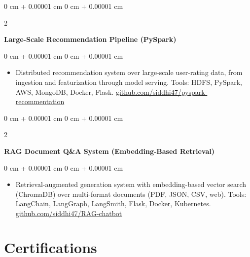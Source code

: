 \documentclass[10pt, letterpaper]{article}
\newenvironment{highlights}{
    \begin{itemize}[
        topsep=0.04 cm,
        parsep=0.04 cm,
        partopsep=0pt,
        itemsep=0pt,
        leftmargin=0 cm + 10pt
    ]
}{
    \end{itemize}
} %
\newenvironment{onecolentry}{
    \begin{adjustwidth}{
        0 cm + 0.00001 cm
    }{
        0 cm + 0.00001 cm
    }
}{
    \end{adjustwidth}
} %
\newenvironment{twocolentry}[2][]{
    \onecolentry
    \def\secondColumn{#2}
    \setcolumnwidth{\fill, 4.5 cm}
    \begin{paracol}{2}
}{
    \switchcolumn \raggedleft \secondColumn
    \end{paracol}
    \endonecolentry
} %
\begin{document}
        \vspace{0.1 cm}

        \begin{twocolentry}{
        }
            \textbf{Large-Scale Recommendation Pipeline (PySpark)}\end{twocolentry}

        \vspace{0.06 cm}
        \begin{onecolentry}
            \begin{highlights}
                \item Distributed recommendation system over large-scale user-rating data, from ingestion and featurization through model serving. Tools: HDFS, PySpark, AWS, MongoDB, Docker, Flask. \href{https://github.com/siddhi47/pyspark-recommentation}{github.com/siddhi47/pyspark-recommentation}
            \end{highlights}
        \end{onecolentry}

        \vspace{0.1 cm}

        \begin{twocolentry}{
        }
            \textbf{RAG Document Q\&A System (Embedding-Based Retrieval)}\end{twocolentry}

        \vspace{0.06 cm}
        \begin{onecolentry}
            \begin{highlights}
                \item Retrieval-augmented generation system with embedding-based vector search (ChromaDB) over multi-format documents (PDF, JSON, CSV, web). Tools: LangChain, LangGraph, LangSmith, Flask, Docker, Kubernetes. \href{https://github.com/siddhi47/RAG-chatbot}{github.com/siddhi47/RAG-chatbot}
            \end{highlights}
        \end{onecolentry}


    \section{Certifications}
        
\end{document}
